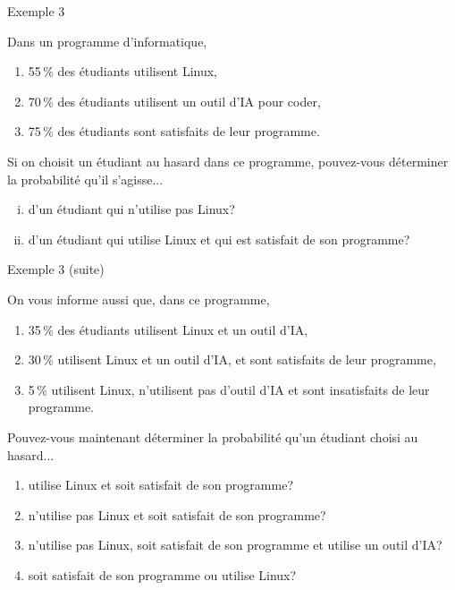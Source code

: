 \documentclass{BeamerTemplate}
\newcommand{\cibleReponse}{}
\newcommand{\lienreponse}[1]{\gdef\cibleReponse{#1}}
\begin{document}
\begin{frame}[t,label=ex3]{Exemple 3}

\begin{minipage}{9cm}{
\small
 Dans un programme d'informatique,
 \begin{enumerate}[$\bullet$]
 \item 55\,\% des étudiants utilisent Linux,
 \item 70\,\% des étudiants utilisent un outil d'IA pour coder,
 \item 75\,\% des étudiants sont satisfaits de leur programme.
 \end{enumerate}
 }
 \end{minipage}


 \bigskip
 {\small
 Si on choisit un étudiant au hasard dans ce programme, pouvez-vous déterminer la probabilité qu'il s'agisse...
  \begin{enumerate}[(i)]\itemsep.8cm
 \item d'un étudiant qui n'utilise pas Linux? %
  \item d'un étudiant qui utilise Linux et qui est satisfait de son programme? %
 \end{enumerate}
}
\lienreponse{rep-ex1}
\end{frame}

\begin{frame}[t]{Exemple 3 (suite)}

{\footnotesize
 On vous informe aussi que, dans ce programme,
 \begin{enumerate}[$\bullet$]
 \item 35\,\% des étudiants utilisent Linux et un outil d'IA,
 \item 30\,\% utilisent Linux et un outil d'IA, et sont satisfaits de leur programme,
 \item 5\,\% utilisent Linux, n'utilisent pas d'outil d'IA et sont insatisfaits de leur programme.
 \end{enumerate}
 Pouvez-vous maintenant déterminer la probabilité qu'un étudiant choisi au hasard...
     \begin{enumerate}\itemsep 4mm
      \item[(iii)] utilise Linux et soit satisfait de son programme? %
      \item[(iv)] n'utilise pas Linux et soit satisfait de son programme? %
      \item[(v)] n'utilise pas Linux, soit satisfait de son programme et utilise un outil d'IA? %
      \item[(vi)] soit satisfait de son programme ou utilise Linux? %
     \end{enumerate}
}
\lienreponse{rep-ex1}
\end{frame}
\end{document}

